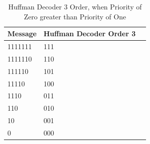 \begin{refsection}
\begin{table}[H]
\centering
\caption{Huffman Decoder 3 Order, when Priority of Zero greater than Priority of One}
\label{tb:hufmmandecoder5}
\begin{tabular}{|l|l|l|}
\hline
\textbf{Message}                      & \textbf{Huffman Decoder Order 3}                                       \\ \hline
 1111111 &111                                                                           \\ \hline
1111110  &110                                                          \\ \hline
111110    &101                                                    \\ \hline
11110      &100                                              \\ \hline
1110        &011                                                  \\ \hline
110          &010                                                 \\ \hline
10            &001                                              \\ \hline
0              &000                                            \\ \hline
\end{tabular}
\end{table}




\end{refsection}

